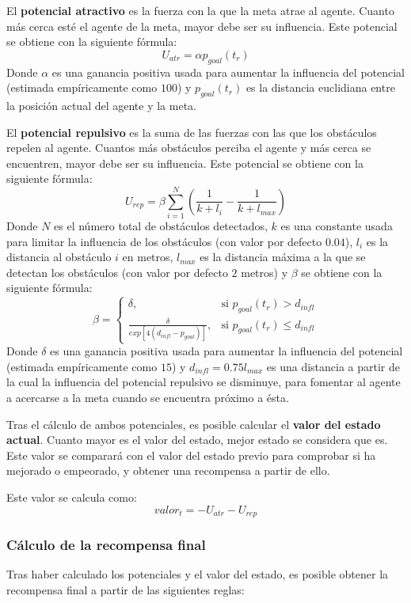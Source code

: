 El \textbf{potencial atractivo} es la fuerza con la que la meta atrae al agente. Cuanto más cerca esté el agente de la meta, mayor debe ser su influencia. Este potencial se obtiene con la siguiente fórmula:
\[U_{atr} = \alpha p_{goal}(t_r)\]
Donde $\alpha$ es una ganancia positiva usada para aumentar la influencia del potencial (estimada empíricamente como $100$) y $p_{goal}(t_r)$ es la distancia euclidiana entre la posición actual del agente y la meta.

El \textbf{potencial repulsivo} es la suma de las fuerzas con las que los obstáculos repelen al agente. Cuantos más obstáculos perciba el agente y más cerca se encuentren, mayor debe ser su influencia. Este potencial se obtiene con la siguiente fórmula:
\[U_{rep} = \beta \sum_{i=1}^{N}(\frac{1}{k+l_i}-\frac{1}{k+l_{max}})\]
Donde $N$ es el número total de obstáculos detectados, $k$ es una constante usada para limitar la influencia de los obstáculos (con valor por defecto $0.04$), $l_i$ es la distancia al obstáculo $i$ en metros, $l_{max}$ es la distancia máxima a la que se detectan los obstáculos (con valor por defecto $2$ metros) y $\beta$ se obtiene con la siguiente fórmula:
\[
\beta = 
\begin{cases}
\delta,& \text{si } p_{goal}(t_r) > d_{infl}\\
\frac{\delta}{exp[4(d_{infl}-p_{goal})]},& \text{si } p_{goal}(t_r) \leq d_{infl}
\end{cases}
\]
Donde $\delta$ es una ganancia positiva usada para aumentar la influencia del potencial (estimada empíricamente como $15$) y $d_{infl}=0.75 l_{max}$ es una distancia a partir de la cual la influencia del potencial repulsivo se disminuye, para fomentar al agente a acercarse a la meta cuando se encuentra próximo a ésta.

Tras el cálculo de ambos potenciales, es posible calcular el \textbf{valor del estado actual}. Cuanto mayor es el valor del estado, mejor estado se considera que es. Este valor se comparará con el valor del estado previo para comprobar si ha mejorado o empeorado, y obtener una recompensa a partir de ello.

Este valor se calcula como:
\[valor_t=-U_{atr}-U_{rep}\]

\subsubsection{Cálculo de la recompensa final}
 
Tras haber calculado los potenciales y el valor del estado, es posible obtener la recompensa final a partir de las siguientes reglas:

